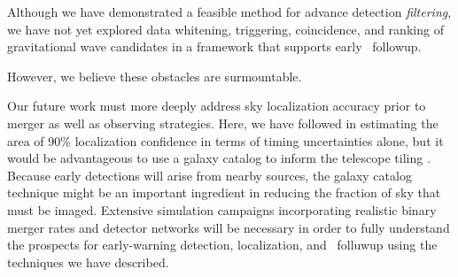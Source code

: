 Although we have demonstrated a feasible method for advance detection
\emph{filtering}, we have not yet explored data whitening, triggering,
coincidence, and ranking of gravitational wave candidates in a framework that
supports early \EM\ followup.
\begin{comment}If adjacent time slices have non-negligible cross-correlation
with each other, then there may be some subtleties in the design of these
postprocessing stages that we must address in order to translate the
early-warning outputs into candidate events.\end{comment}
%
However, we believe these obstacles are surmountable.
\begin{comment}For an example of how the last obstacle could be approached, the
time-slice decomposition and the \SVD\ will help us form low-latency
signal-based vetoes (for example, a $\chi^2$ statistic) that have been
essential for glitch rejection used in previous \GW{} \CBC{}
searches.\end{comment}

Our future work must more deeply address sky localization accuracy prior to
merger as well as observing strategies. Here, we have followed
\citet{Fairhurst2009} in estimating the area of 90\% localization confidence in
terms of timing uncertainties alone, but it would be advantageous to use a
galaxy catalog to inform the telescope tiling \citep{galaxy-catalog}. Because
early detections will arise from nearby sources, the galaxy catalog technique
might be an important ingredient in reducing the fraction of sky that must be
imaged.  Extensive simulation campaigns incorporating realistic binary merger
rates and detector networks will be necessary in order to fully understand the
prospects for early-warning detection, localization, and \EM\ folluwup using
the techniques we have described.



